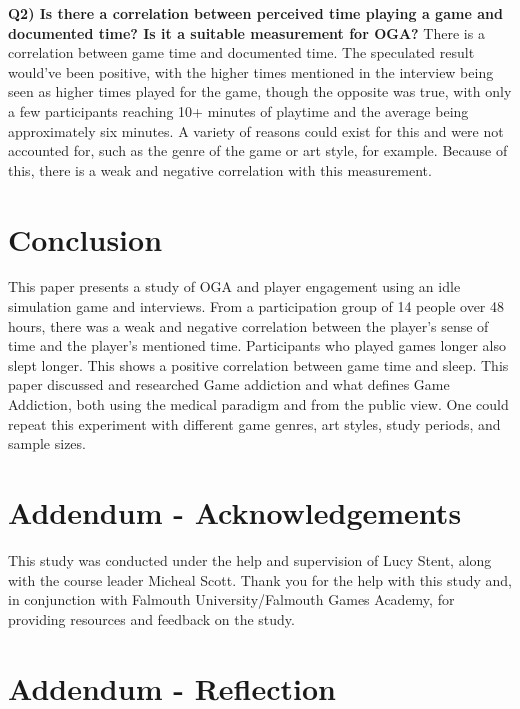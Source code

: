 \documentclass[conference]{IEEEtran}
\begin{document}
 \textbf{Q2) Is there a correlation between perceived time playing a game and documented time? Is it a suitable measurement for OGA?}
There is a correlation between game time and documented time. The speculated result would’ve been positive, with the higher times mentioned in the interview being seen as higher times played for the game, though the opposite was true, with only a few participants reaching 10+ minutes of playtime and the average being approximately six minutes. A variety of reasons could exist for this and were not accounted for, such as the genre of the game or art style, for example. Because of this, there is a weak and negative correlation with this measurement.

\section{Conclusion}
This paper presents a study of OGA and player engagement using an idle simulation game and interviews. From a participation group of 14 people over 48 hours, there was a weak and negative correlation between the player’s sense of time and the player’s mentioned time. Participants who played games longer also slept longer. This shows a positive correlation between game time and sleep. This paper discussed and researched Game addiction and what defines Game Addiction, both using the medical paradigm and from the public view. One could repeat this experiment with different game genres, art styles, study periods, and sample sizes.
 

 
\section{Addendum - Acknowledgements}
This study was conducted under the help and supervision of Lucy Stent, along with the course leader Micheal Scott. Thank you for the help with this study and, in conjunction with Falmouth University/Falmouth Games Academy, for providing resources and feedback on the study.
\section {Addendum - Reflection}
\end{document}
